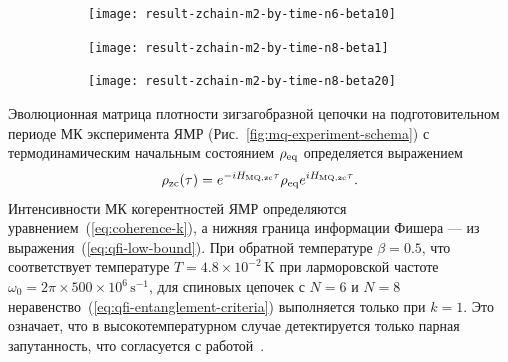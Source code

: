 \begin{figure}[H]
  \begin{subfigure}[t]{0.31\textwidth}
    \texttt{[image: result-zchain-m2-by-time-n6-beta10]}
    \caption{\protect}
    \label{fig:result-zchain-m2-by-time-n6-beta10}
  \end{subfigure}
  \hfill
  \begin{subfigure}[t]{0.32\textwidth}
    \texttt{[image: result-zchain-m2-by-time-n8-beta1]}
    \caption{\protect}
    \label{fig:result-zchain-m2-by-time-n8-beta1}
  \end{subfigure}
  \hfill
  \begin{subfigure}[t]{0.31\textwidth}
    \texttt{[image: result-zchain-m2-by-time-n8-beta20]}
    \caption{\protect}
    \label{fig:result-zchain-m2-by-time-n8-beta20}
  \end{subfigure}
  \caption{\protect}
  \label{fig:result-zchain-m2-by-time-ns-betas}
\end{figure}


Эволюционная матрица плотности зигзагобразной цепочки на подготовительном периоде МК эксперимента ЯМР (Рис.~\ref{fig:mq-experiment-schema})
с термодинамическим начальным состоянием $\rho_\mathrm{eq}$
определяется выражением
%
\begin{equation}\label{eq:rho-eval-zchain}
  \rho_\mathrm{zc}(\tau) = e^{-i H_\mathrm{MQ, zc} \tau}
    \rho_\mathrm{eq} e^{i H_\mathrm{MQ, zc} \tau}.
\end{equation}
%
Интенсивности  МК когерентностей ЯМР определяются уравнением~(\ref{eq:coherence-k}),
а нижняя граница информации Фишера --- из выражения~(\ref{eq:qfi-low-bound}).
При обратной температуре $\beta=0.5$,
что соответствует температуре $T=4.8 \times 10^{-2}\,\mbox{K}$
при ларморовской частоте $\omega_0=2\pi\times 500\times 10^6 \,\mbox{s}^{-1}$,
для спиновых цепочек с $N=6$ и $N=8$
неравенство~(\ref{eq:qfi-entanglement-criteria})  выполняется только при $k=1$.
Это означает, что в высокотемпературном случае
детектируется только парная запутанность,
что согласуется с работой~\cite{Feldman2012}.

